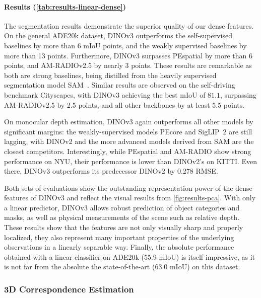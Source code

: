 \paragraph[Results]{Results (\cref{tab:results-linear-dense})}
The segmentation results demonstrate the superior quality of our dense features. 
On the general ADE20k dataset, DINOv3 outperforms the self-supervised baselines by more than 6 mIoU points, and the weakly supervised baselines by more than 13 points.
Furthermore, DINOv3 surpasses PEspatial by more than 6 points, and AM-RADIOv2.5 by nearly 3 points. These results are remarkable as both are strong baselines, being distilled from the heavily supervised segmentation model SAM~\citep{kirillov2023segment}.
Similar results are observed on the self-driving benchmark Cityscapes, with DINOv3 achieving the best mIoU of $81.1$, surpassing AM-RADIOv2.5 by 2.5 points, and all other backbones by at least 5.5 points. 

On monocular depth estimation, DINOv3 again outperforms all other models by significant margins: the weakly-supervised models PEcore and SigLIP~2 are still lagging, with DINOv2 and the more advanced models derived from SAM are the closest competitors.
Interestingly, while PEspatial and AM-RADIO show strong performance on NYU, their performance is lower than DINOv2's on KITTI.
Even there, DINOv3 outperforms its predecessor DINOv2 by 0.278 RMSE.

Both sets of evaluations show the outstanding representation power of the dense features of DINOv3 and reflect the visual results from \cref{fig:results-pca}.
With only a linear predictor, DINOv3 allows robust prediction of object categories and masks, as well as physical measurements of the scene such as relative depth.
These results show that the features are not only visually sharp and properly localized, they also represent many important properties of the underlying observations in a linearly separable way.
Finally, the absolute performance obtained with a linear classifier on ADE20k (55.9 mIoU) is itself impressive, as it is not far from the absolute the state-of-the-art (63.0 mIoU) on this dataset.


\subsubsection{3D Correspondence Estimation} 
\label{sec:results-correspondence-estimation}

